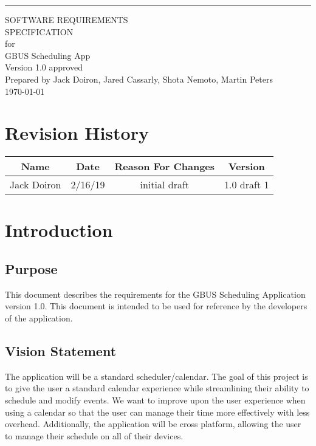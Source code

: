 \documentclass{scrreprt}
\date{}
\def\myversion{1.0 }
\begin{document}
\begin{flushright}
    \rule{16cm}{5pt}\vskip1cm
    \begin{bfseries}
        \Huge{SOFTWARE REQUIREMENTS\\ SPECIFICATION}\\
        \vspace{1.9cm}
        for\\
        \vspace{1.9cm}
        GBUS Scheduling App\\
        \vspace{1.9cm}
        \LARGE{Version \myversion approved}\\
        \vspace{1.9cm}
        Prepared by Jack Doiron, Jared Cassarly, Shota Nemoto, Martin Peters\\
        \vspace{1.9cm}
        \today\\
    \end{bfseries}
\end{flushright}

\tableofcontents


\chapter*{Revision History}

\begin{center}
    \begin{tabular}{|c|c|c|c|}
        \hline
	    Name & Date & Reason For Changes & Version\\
        \hline
	    Jack Doiron & 2/16/19 & initial draft & 1.0 draft 1\\
        \hline
    \end{tabular}
\end{center}

\chapter{Introduction}

\section{Purpose}
This document describes the requirements for the GBUS Scheduling Application version 1.0.  This document is intended to be used for reference by the developers of the application.

\section{Vision Statement}
The application will be a standard scheduler/calendar. The goal of this project is to give the user a standard calendar experience while streamlining their ability to schedule and modify events.  We want to improve upon the user experience when using a calendar so that the user can manage their time more effectively with less overhead. Additionally, the application will be cross platform, allowing the user to manage their schedule on all of their devices.\\
\end{document}
